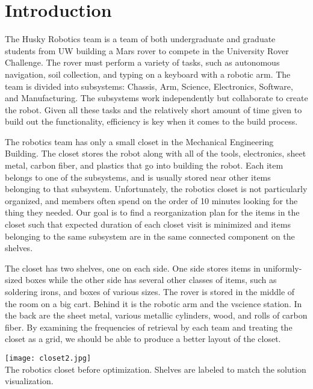 \documentclass[10pt]{article}
\theoremstyle{named}
\begin{document}
\section{Introduction}
The Husky Robotics team is a team of both undergraduate and graduate students
from UW building a Mars rover to compete in the University Rover Challenge.
The rover must perform a variety of tasks, such as autonomous navigation, soil
collection, and typing on a keyboard with a robotic arm. The team is divided
into subsystems: Chassis, Arm, Science, Electronics, Software, and Manufacturing.
The subsystems work independently but collaborate to create the robot. Given
all these tasks and the relatively short amount of time given to build out the
functionality, efficiency is key when it comes to the build process.
\par
The robotics team has only a small closet in the Mechanical Engineering Building.
The closet stores the robot along with all of the tools, electronics, sheet metal,
carbon fiber, and plastics that go into building the robot. Each item belongs to
one of the subsystems, and is usually stored near other items belonging to that
subsystem. Unfortunately, the robotics closet is not particularly organized, and
members often spend on the order of 10 minutes looking for the thing they needed.
Our goal is to find a reorganization plan for the items in the closet such that
expected duration of each closet visit is minimized and items belonging to the
same subsystem are in the same connected component on the shelves.
\par
The closet has two shelves, one on each side. One side stores items in
uniformly-sized boxes while the other side has several other classes of items,
such as soldering irons, and boxes of various sizes. The rover is stored in
the middle of the room on a big cart. Behind it is the robotic arm and the
vscience station. In the back are the sheet metal, various metallic cylinders,
wood, and rolls of carbon fiber. By examining the frequencies of retrieval
by each team and treating the closet as a grid, we should be able to produce
a better layout of the closet.

\begin{center}
  \texttt{[image: closet2.jpg]} \\
  The robotics closet before optimization. Shelves are labeled to match the solution visualization.
\end{center}
\end{document}
